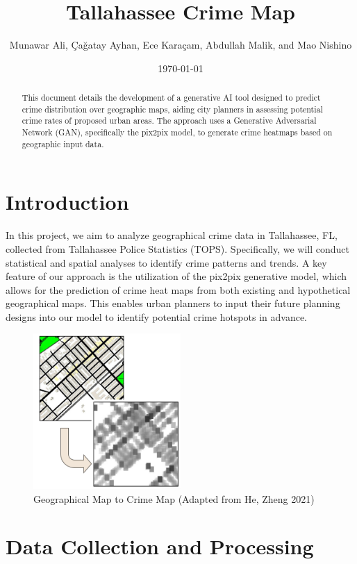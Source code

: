 \documentclass{article}
\title{Tallahassee Crime Map}
\author{Munawar Ali, Çağatay Ayhan, Ece Karaçam, Abdullah Malik, and Mao Nishino}
\date{\today}
\begin{document}
\maketitle

\begin{abstract}
    This document details the development of a generative AI tool designed to predict crime distribution over geographic maps, aiding city planners in assessing potential crime rates of proposed urban areas. The approach uses a Generative Adversarial Network (GAN), specifically the pix2pix model, to generate crime heatmaps based on geographic input data.
\end{abstract}

\section{Introduction}

In this project, we aim to analyze geographical crime data in Tallahassee, FL, collected from Tallahassee Police Statistics (TOPS). Specifically, we will conduct statistical and spatial analyses to identify crime patterns and trends. A key feature of our approach is the utilization of the pix2pix generative model, which allows for the prediction of crime heat maps from both existing and hypothetical geographical maps. This enables urban planners to input their future planning designs into our model to identify potential crime hotspots in advance.

\begin{figure}[!htbp]
    \centering
    \includegraphics[width=0.5\textwidth]{Figures/Intro Figure.png}
    \caption{Geographical Map to Crime Map (Adapted from He, Zheng 2021)}
\end{figure}

\section{Data Collection and Processing}
\end{document}
